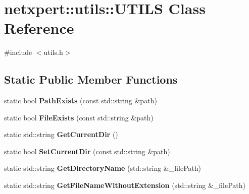 \hypertarget{classnetxpert_1_1utils_1_1UTILS}{}\section{netxpert\+:\+:utils\+:\+:U\+T\+I\+LS Class Reference}
\label{classnetxpert_1_1utils_1_1UTILS}


{\ttfamily \#include $<$utils.\+h$>$}

\subsection*{Static Public Member Functions}
\begin{DoxyCompactItemize}
\item 
static bool {\bfseries Path\+Exists} (const std\+::string \&path)\hypertarget{classnetxpert_1_1utils_1_1UTILS_a3ec5804a79dca438bcc2eba9724a1cee}{}\label{classnetxpert_1_1utils_1_1UTILS_a3ec5804a79dca438bcc2eba9724a1cee}

\item 
static bool {\bfseries File\+Exists} (const std\+::string \&path)\hypertarget{classnetxpert_1_1utils_1_1UTILS_a143eeceead6be450b106f5b1f7f21323}{}\label{classnetxpert_1_1utils_1_1UTILS_a143eeceead6be450b106f5b1f7f21323}

\item 
static std\+::string {\bfseries Get\+Current\+Dir} ()\hypertarget{classnetxpert_1_1utils_1_1UTILS_a820571660f5778938e6a6763f338bb13}{}\label{classnetxpert_1_1utils_1_1UTILS_a820571660f5778938e6a6763f338bb13}

\item 
static bool {\bfseries Set\+Current\+Dir} (const std\+::string \&path)\hypertarget{classnetxpert_1_1utils_1_1UTILS_ac2f7d62ac547561bd266f70f59b31711}{}\label{classnetxpert_1_1utils_1_1UTILS_ac2f7d62ac547561bd266f70f59b31711}

\item 
static std\+::string {\bfseries Get\+Directory\+Name} (std\+::string \&\+\_\+file\+Path)\hypertarget{classnetxpert_1_1utils_1_1UTILS_ae3d6a8e0da3d811b2c2c715b36420b67}{}\label{classnetxpert_1_1utils_1_1UTILS_ae3d6a8e0da3d811b2c2c715b36420b67}

\item 
static std\+::string {\bfseries Get\+File\+Name\+Without\+Extension} (std\+::string \&\+\_\+file\+Path)\hypertarget{classnetxpert_1_1utils_1_1UTILS_ae95928fe63cac5d7c15b8b47d40e3633}{}\label{classnetxpert_1_1utils_1_1UTILS_ae95928fe63cac5d7c15b8b47d40e3633}


\end{DoxyCompactItemize}
